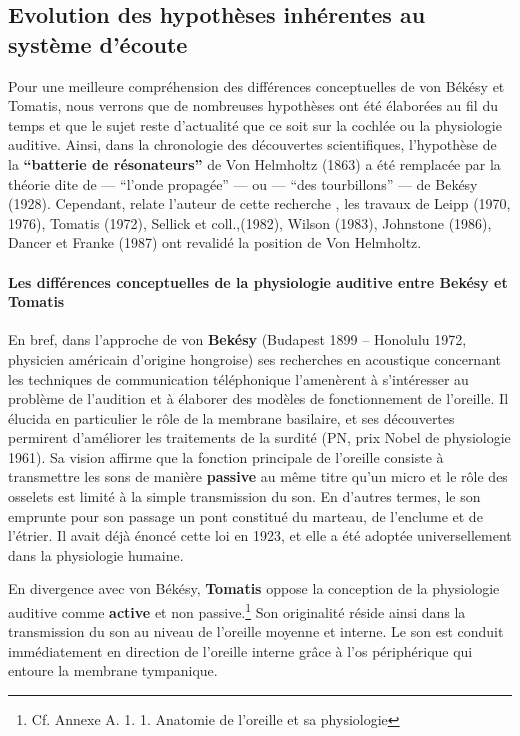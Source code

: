 \subsection*{Evolution des hypothèses inhérentes au système d'écoute}
Pour une meilleure compréhension des différences conceptuelles de von Békésy et Tomatis, nous 
verrons que de nombreuses  hypothèses ont été élaborées au fil du temps et que le sujet reste 
d'actualité que ce soit sur la cochlée ou  la physiologie auditive. %
Ainsi, dans la chronologie des découvertes scientifiques,  l'hypothèse de la \textbf{``batterie de
	résonateurs''}  de Von Helmholtz (1863)  a été remplacée par la
théorie dite de  --- ``l'onde propagée'' --- ou --- ``des
tourbillons'' ---  de Bekésy (1928).
Cependant, relate l'auteur de cette recherche \autocite[24--28] {auriol:cle}, les travaux de Leipp (1970, 
1976), Tomatis (1972), Sellick 
et coll.,(1982), Wilson (1983),
Johnstone (1986), Dancer et
Franke (1987) ont revalidé la position de Von Helmholtz.

\paragraph{Les différences conceptuelles de la physiologie auditive
  entre Bekésy et Tomatis}




En bref, dans  l'approche de von \textbf{ Bekésy} (Budapest 1899 -- Honolulu 1972,
physicien américain d'origine hongroise) ses
recherches en acoustique concernant les techniques de communication
téléphonique l'amenèrent à s'intéresser au problème de l'audition et à
élaborer des modèles de fonctionnement de l'oreille. Il élucida en
particulier le rôle de la membrane basilaire, et ses découvertes
permirent d'améliorer les traitements de la surdité (PN, prix
Nobel de physiologie 1961).
Sa vision affirme que la fonction principale de l'oreille 
consiste à transmettre les sons de manière \textbf{passive} au même titre qu'un micro et le rôle des 
osselets
est limité à la simple transmission du
son. En d'autres termes, le son emprunte pour son passage un pont  constitué du marteau, de l'enclume 
et de l'étrier. Il avait déjà énoncé cette loi en 1923, et elle a été adoptée
universellement dans la physiologie humaine.

En divergence avec von Békésy, \textbf{Tomatis} oppose la conception de la
physiologie auditive comme \textbf{active} et non
passive.\footnote{Cf. Annexe A. 1. 1. Anatomie de l'oreille et sa physiologie}
Son originalité réside ainsi dans la transmission du son
au niveau de l'oreille moyenne et interne. Le son est conduit immédiatement en direction de l'oreille 
interne grâce à l'os périphérique qui entoure la membrane tympanique.

